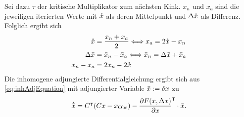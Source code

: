 Sei dazu $\tau$ der kritische Multiplikator zum nächsten Kink. $x_n$ und $x_a$ sind die jeweiligen iterierten Werte mit $\mathring{x}$ als deren Mittelpunkt und $\Delta \mathring{x}$ als Differenz. Folglich ergibt sich 
\begin{align*}
\mathring{x} &= \frac{x_n+x_a}{2}\Longleftrightarrow x_a = 2\mathring{x} - x_n\\
\Delta \bar{x} &= \bar{x}_n - \bar{x}_a \Longleftrightarrow \bar{x}_n = \Delta \bar{x} + \bar{x}_a\\
x_n - x_a &= 2x_n - 2\mathring{x}\\
\end{align*}
Die inhomogene adjungierte Differentialgleichung ergibt sich aus \eqref{eq:inhAdjEquation} mit adjungierter Variable $\bar{x} := \delta x$ zu
\begin{equation}
\dot{\bar{x}} = C^\intercal(Cx - x_{\text{Obs}}) - \frac{\partial F(x,\Delta x)}{\partial x}^\intercal \cdot \bar{x}.
\label{eq:adjModel}
\end{equation}

